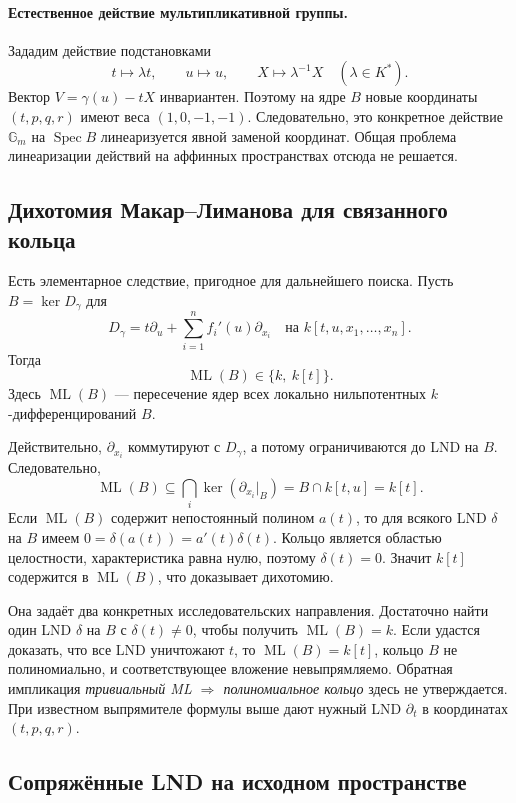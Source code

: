 \paragraph{Естественное действие мультипликативной группы.}
Зададим действие подстановками
\[
 t\longmapsto\lambda t,\qquad
 u\longmapsto u,\qquad X\longmapsto\lambda^{-1}X
 \quad(\lambda\in K^*).
\]
Вектор $V=\gamma(u)-tX$ инвариантен. Поэтому на ядре $B$ новые
координаты $(t,p,q,r)$ имеют веса $(1,0,-1,-1)$. Следовательно,
это конкретное действие $\mathbb G_m$ на $\operatorname{Spec}B$
линеаризуется явной заменой координат. Общая проблема линеаризации
действий на аффинных пространствах отсюда не решается.

\subsection{Дихотомия Макар--Лиманова для связанного кольца}

Есть элементарное следствие, пригодное для дальнейшего поиска.
Пусть $B=\ker D_\gamma$ для
\[
 D_\gamma=t\partial_u+\sum_{i=1}^n f_i'(u)\partial_{x_i}
 \quad\text{на }k[t,u,x_1,\ldots,x_n].
\]
Тогда
\begin{equation}\label{eq:ml-dichotomy}
 \operatorname{ML}(B)\in\{k,\ k[t]\}.
\end{equation}
Здесь $\operatorname{ML}(B)$ --- пересечение ядер всех локально
нильпотентных $k$-дифференцирований $B$.

Действительно, $\partial_{x_i}$ коммутируют с $D_\gamma$, а потому
ограничиваются до LND на $B$. Следовательно,
\[
 \operatorname{ML}(B)\subseteq
 \bigcap_i\ker(\partial_{x_i}|_B)
 =B\cap k[t,u]=k[t].
\]
Если $\operatorname{ML}(B)$ содержит непостоянный полином $a(t)$, то
для всякого LND $\delta$ на $B$ имеем
$0=\delta(a(t))=a'(t)\delta(t)$. Кольцо является областью целостности,
характеристика равна нулю, поэтому $\delta(t)=0$. Значит $k[t]$
содержится в $\operatorname{ML}(B)$, что доказывает дихотомию.

Она задаёт два конкретных исследовательских направления. Достаточно
найти один LND $\delta$ на $B$ с $\delta(t)\ne0$, чтобы получить
$\operatorname{ML}(B)=k$. Если удастся доказать, что все LND уничтожают
$t$, то $\operatorname{ML}(B)=k[t]$, кольцо $B$ не полиномиально, и
соответствующее вложение невыпрямляемо. Обратная импликация
\emph{тривиальный ML $\Rightarrow$ полиномиальное кольцо} здесь не
утверждается. При известном выпрямителе формулы выше дают нужный LND
$\partial_t$ в координатах $(t,p,q,r)$.

\subsection{Сопряжённые LND на исходном пространстве}

